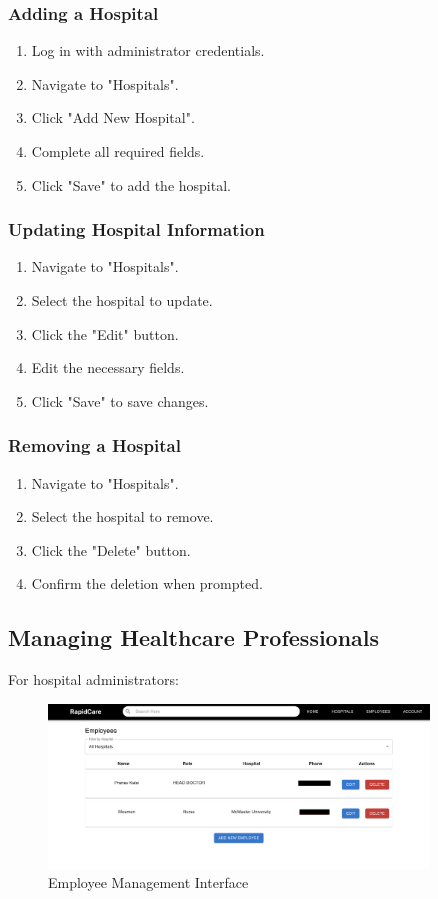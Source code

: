 \documentclass[12pt, titlepage]{article}
\begin{document}
\subsubsection{Adding a Hospital}
\begin{enumerate}
\item Log in with administrator credentials.
\item Navigate to "Hospitals".
\item Click "Add New Hospital".
\item Complete all required fields.
\item Click "Save" to add the hospital.
\end{enumerate}

\subsubsection{Updating Hospital Information}
\begin{enumerate}
\item Navigate to "Hospitals".
\item Select the hospital to update.
\item Click the "Edit" button.
\item Edit the necessary fields.
\item Click "Save" to save changes.
\end{enumerate}

\subsubsection{Removing a Hospital}
\begin{enumerate}
\item Navigate to "Hospitals".
\item Select the hospital to remove.
\item Click the "Delete" button.
\item Confirm the deletion when prompted.
\end{enumerate}

\subsection{Managing Healthcare Professionals}
For hospital administrators:

\begin{figure}[H]
\centering
\includegraphics[width=0.9\textwidth]{employee.png}
\caption{Employee Management Interface}
\label{fig:Employee Management Interface}
\end{figure}
\end{document}
